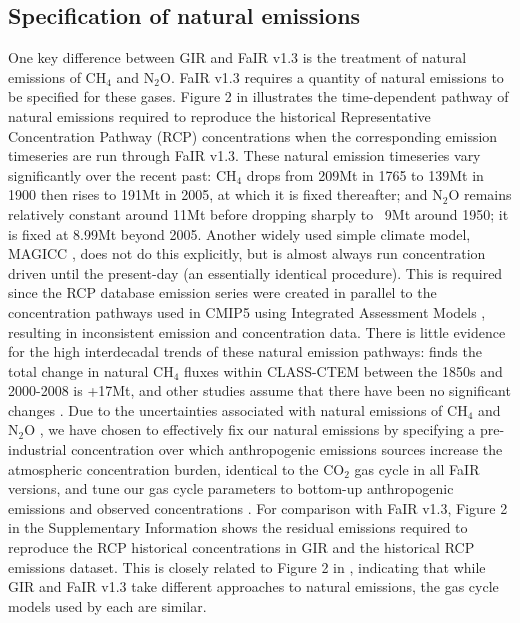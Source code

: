 \documentclass[gmd, manuscript]{copernicus}
\begin{document}
\subsection*{Specification of natural emissions}
One key difference between GIR and FaIR v1.3 is the treatment of natural emissions of CH$_4$ and N$_2$O. FaIR v1.3 requires a quantity of natural emissions to be specified for these gases. Figure 2 in \cite{Smith2017} illustrates the time-dependent pathway of natural emissions required to reproduce the historical Representative Concentration Pathway (RCP) concentrations when the corresponding emission timeseries \citep{Meinshausen2011c} are run through FaIR v1.3. These natural emission timeseries vary significantly over the recent past: CH$_4$ drops from 209Mt in 1765 to 139Mt in 1900 then rises to 191Mt in 2005, at which it is fixed thereafter; and N$_2$O remains relatively constant around 11Mt before dropping sharply to ~9Mt around 1950; it is fixed at 8.99Mt beyond 2005. Another widely used simple climate model, MAGICC \citep{Meinshausen2011}, does not do this explicitly, but is almost always run concentration driven until the present-day (an essentially identical procedure). This is required since the RCP database emission series were created in parallel to the concentration pathways used in CMIP5 using Integrated Assessment Models \citep{Moss2010}, resulting in inconsistent emission and concentration data. There is little evidence for the high interdecadal trends of these natural emission pathways: \cite{Arora2018} finds the total change in natural CH$_4$ fluxes within CLASS-CTEM between the 1850s and 2000-2008 is +17Mt, and other studies assume that there have been no significant changes \citep{Holmes2013,Prather2012}. Due to the uncertainties associated with natural emissions of CH$_4$ and N$_2$O \citep{Turner2019,Davidson2014}, we have chosen to effectively fix our natural emissions by specifying a pre-industrial concentration over which anthropogenic emissions sources increase the atmospheric concentration burden, identical to the CO$_2$ gas cycle in all FaIR versions, and tune our gas cycle parameters to bottom-up anthropogenic emissions \citep{Gutschow2016,Quere2018} and observed concentrations \citep{Meinshausen2017}. For comparison with FaIR v1.3, Figure 2 in the Supplementary Information shows the residual emissions required to reproduce the RCP historical concentrations in GIR and the historical RCP emissions dataset. This is closely related to Figure 2 in \cite{Smith2017}, indicating that while GIR and FaIR v1.3 take different approaches to natural emissions, the gas cycle models used by each are similar.
\end{document}

